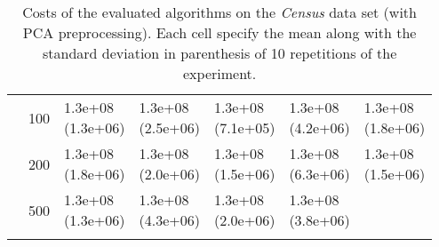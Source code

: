 \begin{longtable}{lllllll}
   & 100 &  \parbox[t]{17mm}{1.3e+08\\\small(1.3e+06)} &  \parbox[t]{17mm}{1.3e+08\\\small(2.5e+06)} &  \parbox[t]{17mm}{1.3e+08\\\small(7.1e+05)} &  \parbox[t]{17mm}{1.3e+08\\\small(4.2e+06)} &  \parbox[t]{17mm}{1.3e+08\\\small(1.8e+06)} \\
   & 200 &  \parbox[t]{17mm}{1.3e+08\\\small(1.8e+06)} &  \parbox[t]{17mm}{1.3e+08\\\small(2.0e+06)} &  \parbox[t]{17mm}{1.3e+08\\\small(1.5e+06)} &  \parbox[t]{17mm}{1.3e+08\\\small(6.3e+06)} &  \parbox[t]{17mm}{1.3e+08\\\small(1.5e+06)} \\
   & 500 &  \parbox[t]{17mm}{1.3e+08\\\small(1.3e+06)} &  \parbox[t]{17mm}{1.3e+08\\\small(4.3e+06)} &  \parbox[t]{17mm}{1.3e+08\\\small(2.0e+06)} &  \parbox[t]{17mm}{1.3e+08\\\small(3.8e+06)} &                 \\
\bottomrule
\caption{Costs of the evaluated algorithms on the \textit{Census} data set (with PCA preprocessing). Each cell specify the mean along with the standard deviation in parenthesis of 10 repetitions of the experiment.}
\label{tab:real-cost-mean-std-census-pca}
\end{longtable}

